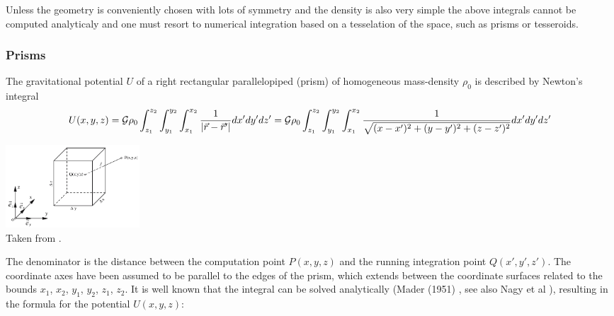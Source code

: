
Unless the geometry is conveniently chosen with lots of symmetry and the density is also very simple the above 
integrals cannot be computed analyticaly and one must resort to numerical integration based on a tesselation of the 
space, such as prisms or tesseroids. 

\subsubsection{Prisms}


The gravitational potential $U$ of a right rectangular parallelopiped (prism) of homogeneous mass-density $\rho_0$ is
described by Newton’s integral \cite{hese07}
\[
U(x,y,z) 
= {\cal G} \rho_0 \int_{z_1}^{z_2}\int_{y_1}^{y_2}\int_{x_1}^{x_2} \frac{1}{|\vec r-\vec r'|}dx'dy'dz'
= {\cal G} \rho_0 \int_{z_1}^{z_2}\int_{y_1}^{y_2}\int_{x_1}^{x_2} \frac{1}{\sqrt{(x-x')^2+(y-y')^2+(z-z')^2} }dx'dy'dz'
\]

\begin{center}
\includegraphics[width=5cm]{images/gravity/hese07}\\
{\captionfont Taken from \cite{hese07}.}
\end{center}

The denominator is the distance between the computation point $P(x,y,z)$ 
and the running integration point $Q(x',y',z')$. 
The coordinate axes have been assumed to be parallel to the edges of the prism, which
extends between the coordinate surfaces related to the
bounds $x_1$, $x_2$, $y_1$, $y_2$, $z_1$, $z_2$.
It is well known that the integral can be solved analytically (Mader (1951) \cite{made51}, see also Nagy et al \cite{napb00,napb02}), 
resulting in the formula for the potential $U(x,y,z)$:

